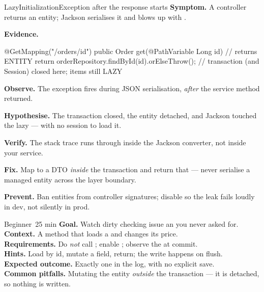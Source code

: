 \begin{debuglab}{LazyInitializationException after the response starts}
\textbf{Symptom.} A controller returns an  entity; Jackson serialises it and blows up with .

\smallskip\textbf{Evidence.}
\begin{javabox}
@GetMapping("/orders/{id}")
public Order get(@PathVariable Long id) {          // returns ENTITY
  return orderRepository.findById(id).orElseThrow();
}   // transaction (and Session) closed here; items still LAZY
\end{javabox}

\begin{tickcheck}
  \item \textbf{Observe.} The exception fires during JSON serialisation, \emph{after} the service method returned.
  \item \textbf{Hypothesise.} The transaction closed, the entity detached, and Jackson touched the lazy  --- with no session to load it.
  \item \textbf{Verify.} The stack trace runs through  inside the Jackson converter, not inside your service.
  \item \textbf{Fix.} Map to a DTO \emph{inside} the transaction and return that --- never serialise a managed entity across the layer boundary.
  \item \textbf{Prevent.} Ban entities from controller signatures; disable  so the leak fails loudly in dev, not silently in prod.
\end{tickcheck}
\end{debuglab}


\begin{minilab}{Beginner}{~25 min}
\textbf{Goal.} Watch dirty checking issue an  you never asked for.\\
\textbf{Context.} A  method that loads a  and changes its price.\\
\textbf{Requirements.} Do \emph{not} call ; enable ; observe the  at commit.\\
\textbf{Hints.} Load by id, mutate a field, return; the write happens on flush.\\
\textbf{Expected outcome.} Exactly one  in the log, with no explicit save.\\
\textbf{Common pitfalls.} Mutating the entity \emph{outside} the transaction --- it is detached, so nothing is written.
\end{minilab}

